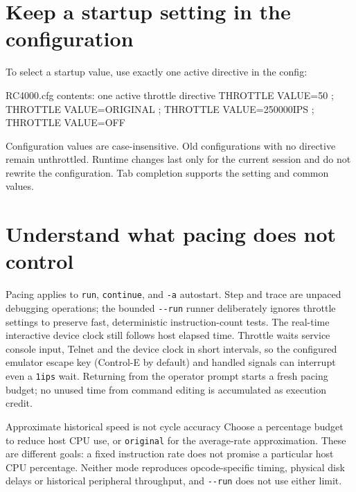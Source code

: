 \section{Keep a startup setting in the configuration}\label{keep-a-startup-throttle-setting}

To select a startup value, use exactly one active directive in the config:

\begin{commandexample}{RC4000.cfg contents: one active throttle directive}
THROTTLE VALUE=50%
; THROTTLE VALUE=ORIGINAL
; THROTTLE VALUE=250000IPS
; THROTTLE VALUE=OFF
\end{commandexample}

Configuration values are case-insensitive. Old configurations with no directive remain unthrottled. Runtime changes last only for the current session and do not rewrite the configuration. Tab completion supports the setting and common values.

\section{Understand what pacing does not control}\label{understand-what-pacing-does-not-control}

Pacing applies to \passthrough{\lstinline!run!}, \passthrough{\lstinline!continue!}, and \passthrough{\lstinline!-a!} autostart. Step and trace are unpaced debugging operations; the bounded \passthrough{\lstinline!--run!} runner deliberately ignores throttle settings to preserve fast, deterministic instruction-count tests. The real-time interactive device clock still follows host elapsed time. Throttle waits service console input, Telnet and the device clock in short intervals, so the configured emulator escape key (Control-E by default) and handled signals can interrupt even a \passthrough{\lstinline!1ips!} wait. Returning from the operator prompt starts a fresh pacing budget; no unused time from command editing is accumulated as execution credit.

\begin{operationnote}{Approximate historical speed is not cycle accuracy}
Choose a percentage budget to reduce host CPU use, or \passthrough{\lstinline!original!} for the average-rate approximation. These are different goals: a fixed instruction rate does not promise a particular host CPU percentage. Neither mode reproduces opcode-specific timing, physical disk delays or historical peripheral throughput, and \passthrough{\lstinline!--run!} does not use either limit.
\end{operationnote}
